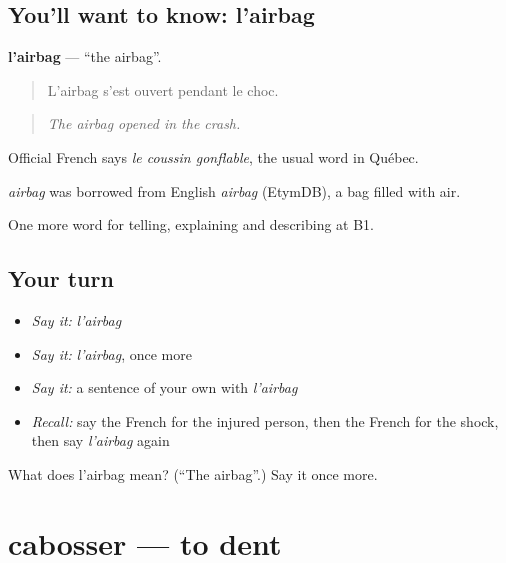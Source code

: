 \subsection*{You'll want to know: l'airbag}
\textbf{l'airbag} — \textquotedblleft{}the airbag\textquotedblright{}.

\begin{quote}
L'airbag s'est ouvert pendant le choc.
\end{quote}

\begin{quote}
\emph{The airbag opened in the crash.}
\end{quote}

Official French says \emph{le coussin gonflable}, the usual word in Québec.

\begin{cousinweb}
\emph{airbag} was borrowed from English \emph{airbag} (EtymDB), a bag filled with air.
\end{cousinweb}

\begin{grammarlens}[title={What you've built}]
One more word for telling, explaining and describing at B1.
\end{grammarlens}

\subsection*{Your turn}
\begin{itemize}
\raggedright
  \item \emph{Say it:} \emph{l'airbag}
  \item \emph{Say it:} \emph{l'airbag}, once more
  \item \emph{Say it:} a sentence of your own with \emph{l'airbag}
  \item \emph{Recall:} say the French for the injured person, then the French for the shock, then say \emph{l'airbag} again
\end{itemize}

\begin{tcolorbox}[breakable,colback=teal!4,colframe=teal!35!black,title={Before you move on}]
What does l'airbag mean? (\textquotedblleft{}The airbag\textquotedblright{}.) Say it once more.
\end{tcolorbox}
\section[cabosser]{cabosser — to dent}

